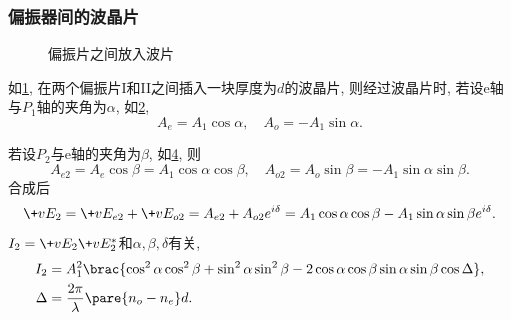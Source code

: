 \documentclass{ctexart}
\begin{document}
\subsubsection{偏振器间的波晶片} %
\label{ssub:偏振器间的波晶片}

\begin{figure}[htb]
    \centering
    \caption{偏振片之间放入波片}
    \label{fig:偏振片之间放入波片}
\end{figure}
如\cref{fig:偏振片之间放入波片}, 在两个偏振片I和II之间插入一块厚度为$d$的波晶片, 则经过波晶片时, 若设e轴与$P_1$轴的夹角为$\alpha$, 如\cref{fig:偏振片之间放入波片坐标系},
\[ A_e = A_1\cos\alpha,\quad A_o = -A_1\sin\alpha. \]
\begin{figure}[t]
    \begin{subfigure}{5cm}
    \centering
    \caption{}
    \label{fig:偏振片之间放入波片坐标系}
    \end{subfigure}
    \hspace{1.5cm}
    \begin{subfigure}{5cm}
    \centering
    \caption{}
    \label{fig:偏振片之间放入波片坐标系2}
    \end{subfigure}
    \caption{}
\end{figure}
若设$P_2$与e轴的夹角为$\beta$, 如\cref{fig:偏振片之间放入波片坐标系2}, 则
\[ A_{e2} = A_e\cos\beta = A_1\cos\alpha\cos\beta,\quad A_{o2} = A_o\sin\beta = -A_1\sin\alpha\sin\beta. \]
合成后
\[ \+vE_2 = \+vE_{e2} + \+vE_{o2} = A_{e2} + A_{o2}e^{i\delta} = A_1\cos\alpha\cos\beta - A_1\sin\alpha\sin\beta e^{i\delta}. \]
$I_2 = \+vE_2\+vE_2^*$和$\alpha,\beta,\delta$有关,
\begin{align*}
    I_2 &= A_1^2\brac{\cos^2\alpha\cos^2\beta + \sin^2\alpha\sin^2\beta - 2\cos\alpha\cos\beta\sin\alpha\sin\beta\cos\Delta}, \\
    \Delta &= \frac{2\pi}{\lambda}\pare{n_o - n_e} d.
\end{align*}
\begin{figure}[ht]
    \centering
    \begin{subfigure}{5cm}
        \centering
        \caption{}
        \label{fig:双偏振片例1}
    \end{subfigure}
    \begin{subfigure}{5cm}
        \centering
        \caption{}
        \label{fig:双偏振片例2}
    \end{subfigure}
\end{figure}
\end{document}
